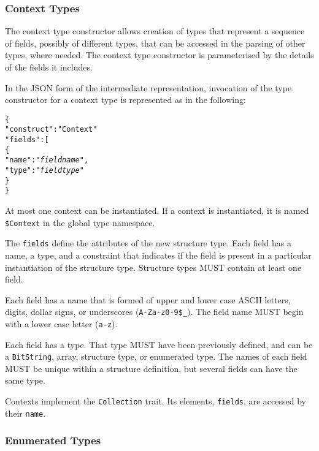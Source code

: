 \documentclass[10pt,twocolumn,a4paper]{article}
\newcommand{\code}[1]{\texttt{#1}}
\begin{document}
\subsubsection{Context Types}

The context type constructor allows creation of types that represent a sequence of fields,
possibly of different types, that can be accessed in the parsing of other types, where
needed. The context type constructor is parameterised by the details of the fields it
includes.

In the JSON form of the intermediate representation, invocation of the type
constructor for a context type is represented as in the following:
\footnotesize
\begin{alltt}
  \{
    "construct"   : "Context"
    "fields"      : [
      \{
        "name"       : "\emph{field name}",
        "type"       : "\emph{field type}"
      \}
  \}
\end{alltt}
\normalsize

At most one context can be instantiated. If a context is instantiated, it is named
\code{\$Context} in the global type namespace. 

The \code{fields} define the attributes of the new structure type. Each
field has a name, a type, and a constraint that indicates if the field is
present in a particular instantiation of the structure type. Structure
types MUST contain at least one field.

Each field has a name that is formed of upper and lower case ASCII letters,
digits, dollar signs, or underscores (\code{A-Za-z0-9\$\_}). The field name
MUST begin with a lower case letter (\code{a-z}).

Each field has a type. That type MUST have been previously defined, and can
be a \code{BitString}, array, structure type, or enumerated type. The names
of each field MUST be unique within a structure definition, but several
fields can have the same type.

Contexts implement the \code{Collection} trait. Its elements, \code{fields}, are
accessed by their \code{name}.

\subsubsection{Enumerated Types}
\end{document}
